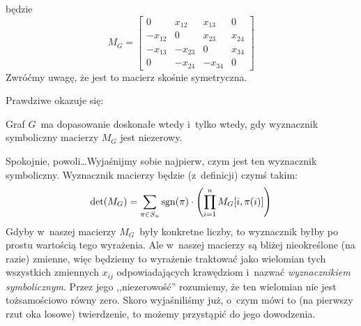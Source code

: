 będzie
\begin{equation*}
	M_G = \begin{bmatrix}
		0       & x_{12}  & x_{13}  & 0      \\
		-x_{12} & 0       & x_{23}  & x_{24} \\
		-x_{13} & -x_{23} & 0       & x_{34} \\
		0       & -x_{24} & -x_{34} & 0
	\end{bmatrix}
\end{equation*}
Zwróćmy uwagę, że jest to macierz skośnie symetryczna.

Prawdziwe okazuje się:
\begin{theorem}
	Graf $G$~ma dopasowanie doskonałe wtedy i~tylko wtedy, gdy wyznacznik symboliczny macierzy $M_G$ jest niezerowy.
\end{theorem}
Spokojnie, powoli\dots Wyjaśnijmy sobie najpierw, czym jest ten wyznacznik symboliczny. Wyznacznik macierzy będzie (z~definicji) czymś takim:
\begin{equation*}
	\det\pars{M_G} = \sum_{\pi \in S_n}\sgn\pars{\pi} \cdot \pars{\prod_{i = 1}^{n}M_G[i, \pi\pars{i}]}
\end{equation*}
Gdyby w~naszej macierzy $M_G$~były konkretne liczby, to wyznacznik byłby po prostu wartością tego wyrażenia. Ale w~naszej macierzy są bliżej nieokreślone (na razie) zmienne, więc będziemy to wyrażenie traktować jako wielomian tych wszystkich zmiennych $x_{ij}$ odpowiadających krawędziom i~nazwać \emph{wyznacznikiem symbolicznym}. Przez jego ,,niezerowość'' rozumiemy, że ten wielomian nie jest tożsamościowo równy zero. Skoro wyjaśniliśmy już, o~czym mówi to (na pierwszy rzut oka losowe) twierdzenie, to możemy przystąpić do jego dowodzenia.
